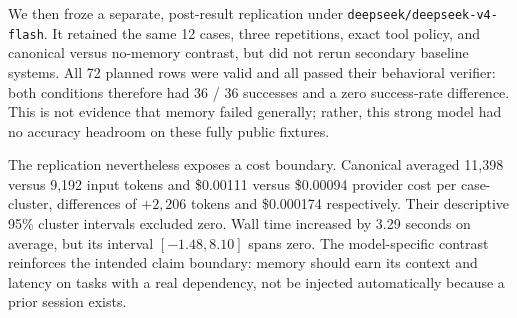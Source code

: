 We then froze a separate, post-result replication under
\texttt{deepseek/deepseek-v4-flash}. It retained the same 12 cases, three
repetitions, exact tool policy, and canonical \memorix{} versus no-memory
contrast, but did not rerun secondary baseline systems. All 72 planned rows
were valid and all passed their behavioral verifier: both conditions therefore
had 36 / 36 successes and a zero success-rate difference. This is not evidence
that memory failed generally; rather, this strong model had no accuracy headroom
on these fully public fixtures.

The replication nevertheless exposes a cost boundary. Canonical \memorix{}
averaged 11,398 versus 9,192 input tokens and \$0.00111 versus \$0.00094
provider cost per case-cluster, differences of $+2{,}206$ tokens and
\$0.000174 respectively. Their descriptive 95\% cluster intervals excluded
zero. Wall time increased by 3.29 seconds on average, but its interval
$[-1.48, 8.10]$ spans zero. The model-specific contrast reinforces the intended
claim boundary: memory should earn its context and latency on tasks with a
real dependency, not be injected automatically because a prior session exists.

